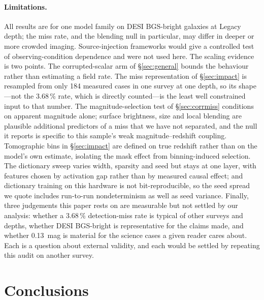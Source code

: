 \documentclass[11pt]{article}
\begin{document}
\paragraph{Limitations.} All results are for one model family on DESI BGS-bright galaxies at
Legacy depth; the miss rate, and the blending null in particular, may differ in deeper or more
crowded imaging. Source-injection frameworks \citep{suchyta2016balrog,everett2022balrog} would
give a controlled test of observing-condition dependence and were not used here. The scaling
evidence is two points. The corrupted-scalar arm of \S\ref{sec:general} bounds the behaviour
rather than estimating a field rate. The miss representation of \S\ref{sec:impact} is resampled
from only 184 measured cases in one survey at one depth, so its shape---not the 3.68\,\% rate,
which is directly counted---is the least well constrained input to that number. The
magnitude-selection test of \S\ref{sec:corrmiss} conditions on apparent magnitude alone;
surface brightness, size and local blending are plausible additional predictors of a miss that
we have not separated, and the null it reports is specific to this sample's weak
magnitude--redshift coupling. Tomographic bins in \S\ref{sec:impact} are defined on true
redshift rather than on the model's own estimate, isolating the mask effect from
binning-induced selection. The dictionary sweep varies width, sparsity and seed but stays at
one layer, with features chosen by activation gap rather than by measured causal effect; and
dictionary training on this hardware is not bit-reproducible, so the seed spread we quote
includes run-to-run nondeterminism as well as seed variance. Finally, three
judgements this paper rests on are measurable but not settled by our analysis: whether a
3.68\,\% detection-miss rate is typical of other surveys and depths, whether DESI BGS-bright is
representative for the claims made, and whether \SI{0.13}{mag} is material for the science cases
a given reader cares about. Each is a question about external validity, and each would be
settled by repeating this audit on another survey.

\section{Conclusions}
\end{document}
